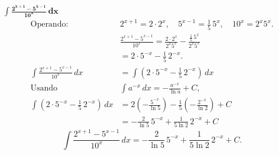 $\displaystyle \mathbf{\int \frac{2^{x+1} - 5^{x-1}}{10^{x}}\,dx}$
\nopagebreak
\begin{align*}
\text{Operando: } &2^{x+1} = 2\cdot 2^{x}, \quad 5^{x-1} = \frac{1}{5}\,5^{x}, \quad 10^{x}=2^{x}5^{x}. \\[6pt]
&\frac{2^{x+1} - 5^{x-1}}{10^{x}}
= \frac{2\cdot 2^{x}}{2^{x}5^{x}} - \frac{\tfrac{1}{5}\,5^{x}}{2^{x}5^{x}} \\[6pt]
&= 2\cdot 5^{-x} - \frac{1}{5}\,2^{-x}. \\[6pt]
\int \frac{2^{x+1} - 5^{x-1}}{10^{x}}\,dx
&= \int \left(2\cdot 5^{-x} - \frac{1}{5}\,2^{-x}\right)\,dx \\[6pt]
\text{Usando } &\int a^{-x}\,dx = -\frac{a^{-x}}{\ln a} + C, \\[6pt]
\int \left(2\cdot 5^{-x} - \frac{1}{5}\,2^{-x}\right)\,dx
&= 2\left(-\frac{5^{-x}}{\ln 5}\right) - \frac{1}{5}\left(-\frac{2^{-x}}{\ln 2}\right) + C \\[6pt]
&= -\frac{2}{\ln 5}\,5^{-x} + \frac{1}{5\ln 2}\,2^{-x} + C
\end{align*}
\[
\boxed{\displaystyle 
\int \frac{2^{x+1} - 5^{x-1}}{10^{x}}\,dx
= -\frac{2}{\ln 5}\,5^{-x} + \frac{1}{5\ln 2}\,2^{-x} + C.}
\]
